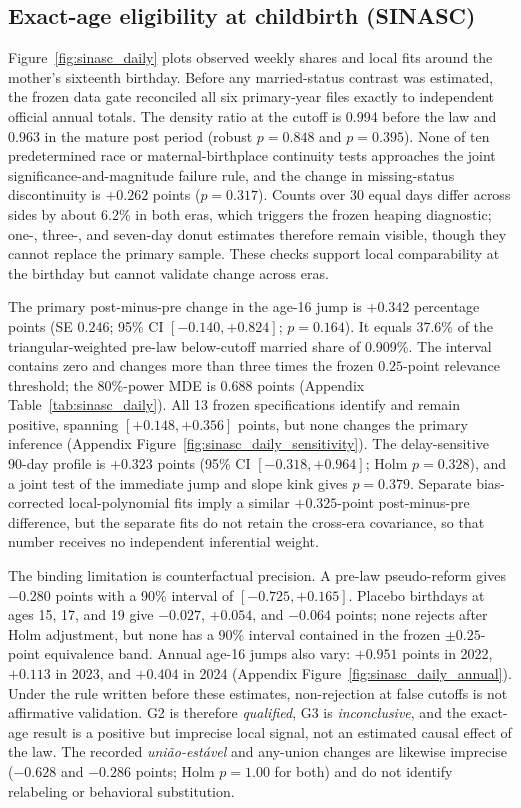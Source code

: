 \documentclass[12pt]{article}
\begin{document}
\subsection{Exact-age eligibility at childbirth (SINASC)}

Figure~\ref{fig:sinasc_daily} plots observed weekly shares and local fits around the
mother's sixteenth birthday. Before any married-status contrast was estimated, the
frozen data gate reconciled all six primary-year files exactly to independent official
annual totals. The density ratio at the cutoff is 0.994 before the law and 0.963 in the
mature post period (robust $p=0.848$ and $p=0.395$). None of ten predetermined race or
maternal-birthplace continuity tests approaches the joint significance-and-magnitude
failure rule, and the change in missing-status discontinuity is $+0.262$ points
($p=0.317$). Counts over 30 equal days differ across sides by about 6.2\% in both eras,
which triggers the frozen heaping diagnostic; one-, three-, and seven-day donut estimates
therefore remain visible, though they cannot replace the primary sample. These checks
support local comparability at the birthday but cannot validate change across eras.

The primary post-minus-pre change in the age-16 jump is $+0.342$ percentage points
(SE $0.246$; 95\% CI $[-0.140, +0.824]$; $p=0.164$). It equals 37.6\% of the
triangular-weighted pre-law below-cutoff married share of 0.909\%. The interval contains
zero and changes more than three times the frozen $0.25$-point relevance threshold; the
80\%-power MDE is $0.688$ points (Appendix Table~\ref{tab:sinasc_daily}). All 13 frozen specifications identify and remain
positive, spanning $[+0.148, +0.356]$ points, but none changes the primary inference
(Appendix Figure~\ref{fig:sinasc_daily_sensitivity}).
The delay-sensitive 90-day profile is $+0.323$ points (95\% CI
$[-0.318, +0.964]$; Holm $p=0.328$), and a joint test of the immediate jump and slope
kink gives $p=0.379$. Separate bias-corrected local-polynomial fits imply a similar
$+0.325$-point post-minus-pre difference, but the separate fits do not retain the
cross-era covariance, so that number receives no independent inferential weight.

The binding limitation is counterfactual precision. A pre-law pseudo-reform gives
$-0.280$ points with a 90\% interval of $[-0.725, +0.165]$. Placebo birthdays at ages
15, 17, and 19 give $-0.027$, $+0.054$, and $-0.064$ points; none rejects after Holm
adjustment, but none has a 90\% interval contained in the frozen $\pm0.25$-point
equivalence band. Annual age-16 jumps also vary: $+0.951$ points in 2022, $+0.113$ in
2023, and $+0.404$ in 2024 (Appendix Figure~\ref{fig:sinasc_daily_annual}). Under the rule written before these estimates, non-rejection
at false cutoffs is not affirmative validation. G2 is therefore \emph{qualified}, G3 is
\emph{inconclusive}, and the exact-age result is a positive but imprecise local signal,
not an estimated causal effect of the law. The recorded \emph{uni\~ao-est\'avel} and
any-union changes are likewise imprecise ($-0.628$ and $-0.286$ points; Holm
$p=1.00$ for both) and do not identify relabeling or behavioral substitution.
\end{document}
